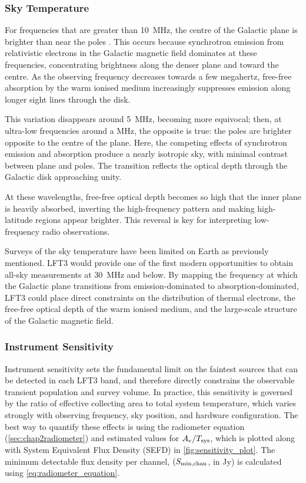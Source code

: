 \subsubsection{Sky Temperature}
For frequencies that are greater than 10~MHz, the centre of the Galactic plane is brighter than near the poles \citep{manning_galactic_2001}. This occurs because synchrotron emission from relativistic electrons in the Galactic magnetic field dominates at these frequencies, concentrating brightness along the denser plane and toward the centre. As the observing frequency decreases towards a few megahertz, free-free absorption by the warm ionised medium increasingly suppresses emission along longer sight lines through the disk.  

This variation disappears around 5~MHz, becoming more equivocal; then, at ultra-low frequencies around a MHz, the opposite is true: the poles are brighter opposite to the centre of the plane. Here, the competing effects of synchrotron emission and absorption produce a nearly isotropic sky, with minimal contrast between plane and poles. The transition reflects the optical depth through the Galactic disk approaching unity. 

At these wavelengths, free-free optical depth becomes so high that the inner plane is heavily absorbed, inverting the high-frequency pattern and making high-latitude regions appear brighter. This reversal is key for interpreting low-frequency radio observations. 

Surveys of the sky temperature have been limited on Earth as previously mentioned. LFT3 would provide one of the first modern opportunities to obtain all-sky measurements at 30~MHz and below. By mapping the frequency at which the Galactic plane transitions from emission-dominated to absorption-dominated, LFT3 could place direct constraints on the distribution of thermal electrons, the free-free optical depth of the warm ionised medium, and the large-scale structure of the Galactic magnetic field.

\subsubsection{Instrument Sensitivity}

Instrument sensitivity sets the fundamental limit on the faintest sources that can be detected in each LFT3 band, and therefore directly constrains the observable transient population and survey volume. In practice, this sensitivity is governed by the ratio of effective collecting area to total system temperature, which varies strongly with observing frequency, sky position, and hardware configuration. The best way to quantify these effects is using the radiometer equation (\cref{sec:chap2radiometer}) and estimated values for $A_e/T_{\rm sys}$, which is plotted along with System Equivalent Flux Density (SEFD) in \cref{fig:sensitivity_plot}. The minimum detectable flux density per channel, $(S_{\rm min, chan}$, in Jy) is calculated using \cref{eq:radiometer_equation}. 


